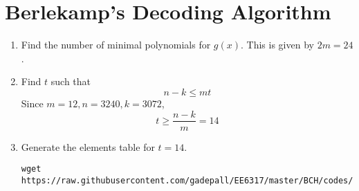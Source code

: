 \documentclass[journal,12pt,twocolumn]{IEEEtran}
\renewcommand\thesection{\arabic{section}}
\begin{document}
\section{Berlekamp's Decoding Algorithm}
\begin{enumerate}[label=\thesection.\arabic*
,ref=\thesection.\theenumi]
\item Find the number of minimal polynomials for $g(x)$.
\solution This is given by $2m = 24$.
\item Find $t$ such that
\begin{equation}
n -k \le mt
\end{equation}
\solution Since $m = 12, n = 3240, k = 3072$,
\begin{equation}
t \ge \frac{n -k}{m} = 14
\end{equation}
\item Generate the elements table for $t=14$.
\\
\solution
\begin{lstlisting}
wget https://raw.githubusercontent.com/gadepall/EE6317/master/BCH/codes/alpha_tables.py
\end{lstlisting}


\end{enumerate}
\end{document}

